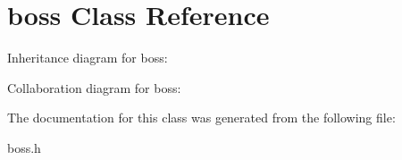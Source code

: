 \hypertarget{classboss}{}\section{boss Class Reference}
\label{classboss}


Inheritance diagram for boss\+:


Collaboration diagram for boss\+:


The documentation for this class was generated from the following file\+:\begin{DoxyCompactItemize}
\item 
boss.\+h\end{DoxyCompactItemize}
